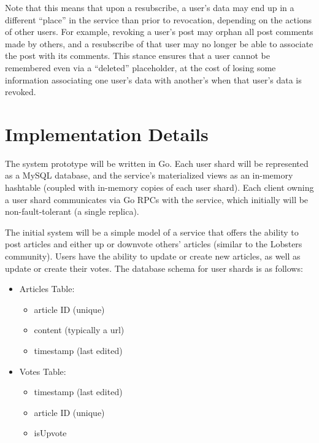 \documentclass[letterpaper,twocolumn,10pt]{article}
\begin{document}
Note that this means that upon a resubscribe, a user's data may end up in a different ``place'' 
in the service than prior to revocation, depending on the actions of other users.
For example, revoking a user's post may orphan all post comments made by others,
and a resubscribe of that user may no longer be able to associate the post with 
its comments. 
This stance ensures that a user cannot be remembered even via a 
``deleted'' placeholder, at the cost of losing some information associating one 
user's data with another's when that user's data is revoked.

\section{Implementation Details}
The system prototype will be written in Go. Each user shard will be represented as a MySQL database, and the service's materialized views as an in-memory hashtable (coupled with in-memory copies of each user shard). Each client owning a user shard communicates via Go RPCs with the service, which initially will be non-fault-tolerant (a single replica).

The initial system will be a simple model of a service that offers the ability to post articles and either up or downvote others' articles (similar to the Lobsters community).
Users have the ability to update or create new articles, as well as update or create their votes.
The database schema for user shards is as follows:
\begin{itemize}
    \item Articles Table:
        \begin{itemize}
            \item article ID (unique)
            \item content (typically a url)
            \item timestamp (last edited)
        \end{itemize}
    \item Votes Table:
        \begin{itemize}
            \item timestamp (last edited)
            \item article ID (unique)
            \item isUpvote
        \end{itemize}
\end{itemize}
\end{document}
